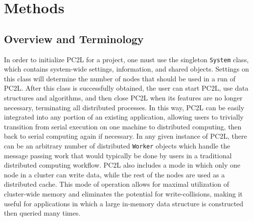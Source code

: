  \chapter{Methods}
 \section{Overview and Terminology}
In order to initialize PC2L for a project, one must use the singleton \texttt{System} class, which contains system-wide settings, information, and shared objects. Settings on this class will determine the number of nodes that should be used in a run of PC2L. After this class is successfully obtained, the user can start PC2L, use data structures and algorithms, and then close PC2L when its features are no longer necessary, terminating all distributed processes. In this way, PC2L can be easily integrated into any portion of an existing application, allowing users to trivially transition from serial execution on one machine to distributed computing, then back to serial computing again if necessary. In any given instance of PC2L, there can be an arbitrary number of distributed \texttt{Worker} objects which handle the message passing work that would typically be done by users in a traditional distributed computing workflow. PC2L also includes a mode in which only one node in a cluster can write data, while the rest of the nodes are used as a distributed cache. This mode of operation allows for maximal utilization of cluster-wide memory and eliminates the potential for write-collisions, making it useful for applications in which a large in-memory data structure is constructed then queried many times. 

